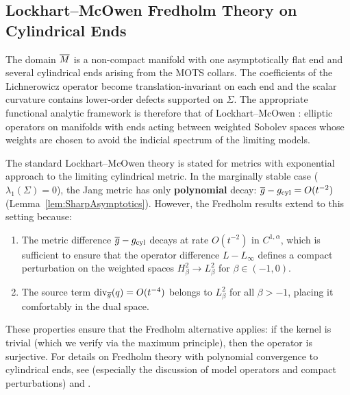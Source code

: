 \subsection{Lockhart--McOwen Fredholm Theory on Cylindrical Ends}
\label{sec:Fredholm}

The domain $\overline{M}$ is a non-compact manifold with one asymptotically flat end and several cylindrical ends arising from the MOTS collars.  The coefficients of the Lichnerowicz operator become translation-invariant on each end and the scalar curvature contains lower-order defects supported on $\Sigma$.  The appropriate functional analytic framework is therefore that of Lockhart--McOwen \cite{lockhartmccowen1985}: elliptic operators on manifolds with ends acting between weighted Sobolev spaces whose weights are chosen to avoid the indicial spectrum of the limiting models.

\begin{remark}\label{rem:PolynomialDecay}
The standard Lockhart--McOwen theory is stated for metrics with exponential approach to the limiting cylindrical metric. In the marginally stable case ($\lambda_1(\Sigma)=0$), the Jang metric has only \textbf{polynomial} decay: $\overline{g} - g_{\text{cyl}} = O(t^{-2})$ (Lemma~\ref{lem:SharpAsymptotics}). However, the Fredholm results extend to this setting because:
\begin{enumerate}
    \item The metric difference $\overline{g} - g_{\text{cyl}}$ decays at rate $O(t^{-2})$ in $C^{1,\alpha}$, which is sufficient to ensure that the operator difference $L - L_\infty$ defines a compact perturbation on the weighted spaces $H^2_\beta \to L^2_\beta$ for $\beta \in (-1,0)$.
    \item The source term $\mathrm{div}_{\overline{g}}(q) = O(t^{-4})$ belongs to $L^2_\beta$ for all $\beta > -1$, placing it comfortably in the dual space.
\end{enumerate}
These properties ensure that the Fredholm alternative applies: if the kernel is trivial (which we verify via the maximum principle), then the operator is surjective. For details on Fredholm theory with polynomial convergence to cylindrical ends, see \cite{lockhartmccowen1985} (especially the discussion of model operators and compact perturbations) and \cite{melrose1996}.
\end{remark}

